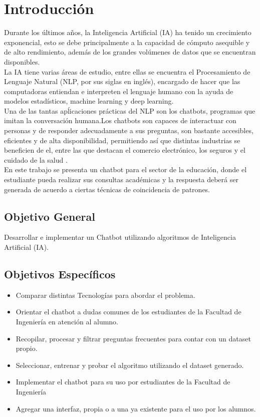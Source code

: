 \chapter[Introducción]{Introducción}
Durante los últimos años, la Inteligencia Artificial (IA) ha tenido un crecimiento exponencial, esto se debe principalmente a la capacidad de cómputo asequible y de alto rendimiento, además de los grandes volúmenes de datos que se encuentran disponibles.\cite{Oracle}\\
\indent La IA tiene varias áreas de estudio, entre ellas se encuentra el Procesamiento de Lenguaje Natural (NLP, por sus siglas en inglés), encargado de hacer que las computadoras entiendan e interpreten el lenguaje humano con la ayuda de modelos estadísticos, machine learning y deep learning.\\
 \indent Una de las tantas apĺicaciones prácticas del NLP son los chatbots, programas que imitan la conversación humana.Los chatbots son capaces de interactuar con personas y de responder adecuadamente a sus preguntas, son bastante accesibles, eficientes y de alta disponibilidad, permitiendo así que distintas industrias se beneficien de el, entre las que destacan el comercio electrónico, los seguros y el cuidado de la salud .\cite{building_chat-bots-with-python}\\
 \indent En este trabajo se presenta un chatbot para el sector de la educación, donde el estudiante pueda realizar sus consultas académicas y la respuesta deberá ser generada de acuerdo a ciertas técnicas de coincidencia de patrones.
 
\section{Objetivo General}
Desarrollar e implementar un Chatbot utilizando algoritmos de Inteligencia Artificial (IA).

\section{Objetivos Específicos}
\begin{itemize}
    \item Comparar distintas Tecnologías para abordar el problema.
    \item Orientar el chatbot a dudas comunes de los estudiantes de la Facultad de Ingeniería en atención al alumno.
    \item Recopilar, procesar y filtrar preguntas frecuentes para contar con un dataset propio.
    \item Seleccionar, entrenar y probar el algoritmo utilizando el dataset generado.
    \item Implementar el chatbot para su uso por estudiantes de la Facultad de Ingeniería
    \item	Agregar una interfaz, propia o a una ya existente para el uso por los alumnos.
\end{itemize}

